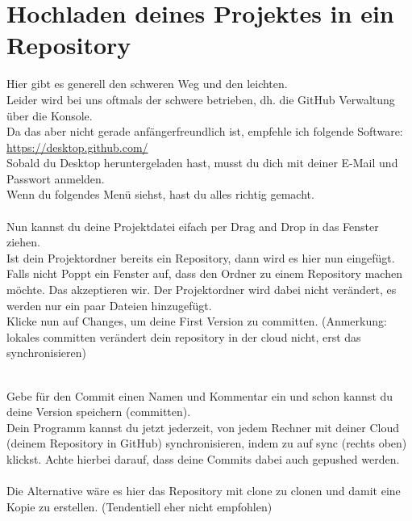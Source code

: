 \documentclass[a4paper,10pt,DIV11,oneside]{scrartcl}
\begin{document}
\section{Hochladen deines Projektes in ein Repository}
Hier gibt es generell den schweren Weg und den leichten.\\
Leider wird bei uns oftmals der schwere betrieben, dh. die GitHub Verwaltung über die Konsole.\\
Da das aber nicht gerade anfängerfreundlich ist, empfehle ich folgende Software:\\
\url{https://desktop.github.com/}\\

Sobald du Desktop heruntergeladen hast, musst du dich mit deiner E-Mail und Passwort anmelden.\\
Wenn du folgendes Menü siehst, hast du alles richtig gemacht.\\

\\

Nun kannst du deine Projektdatei eifach per Drag and Drop in das Fenster ziehen.\\
Ist dein Projektordner bereits ein Repository, dann wird es hier nun eingefügt.\\
Falls nicht Poppt ein Fenster auf, dass den Ordner zu einem Repository machen möchte. Das akzeptieren wir. 
Der Projektordner wird dabei nicht verändert, es werden nur ein paar Dateien hinzugefügt.\\
Klicke nun auf Changes, um deine First Version zu committen. (Anmerkung: lokales committen verändert dein repository in der cloud nicht, erst das synchronisieren)

\\

Gebe für den Commit einen Namen und Kommentar ein und schon kannst du deine Version speichern (committen).\\
Dein Programm kannst du jetzt jederzeit, von jedem Rechner mit deiner Cloud (deinem Repository in GitHub) synchronisieren, indem zu auf sync (rechts oben) klickst. Achte hierbei darauf, dass deine Commits dabei auch gepushed werden. \\\\
Die Alternative wäre es hier das Repository mit clone zu clonen und damit eine Kopie zu erstellen. (Tendentiell eher nicht empfohlen)
\end{document}
